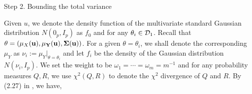 \documentclass[11pt]{article}
\theoremstyle{definition}
\begin{document}
 
 \noindent
 {\sc Step 2}. Bounding the total variance
 
 \noindent
 Given $u$, we denote the density function of the multivariate standard Gaussian distribution $N(0_p, I_p)$ as $f_0$ and for any $\theta_i\in {\cal D}_1$. Recall that $\theta=(\mu_X(\bf u),\mu_Y(\bf u),\Sigma(\bf u))$. For a given $\theta=\theta_i$, we shall denote the corresponding $\mu_Y$ as $\nu_i:=\mu_Y|_{\theta=\theta_i}$ and let $f_i$ be the density of the Gaussian distribution $N(\nu_i, I_p)$. We set the weight to be $\omega_1=\cdots=\omega_m=m^{-1}$ and for any probability measures $Q,R$, we use $\chi^2(Q,R)$ to denote the $\chi^2$ divergence of $Q$ and $R$. By (2.27) in \cite{Tsybakov}, %
 we have,
\end{document}
